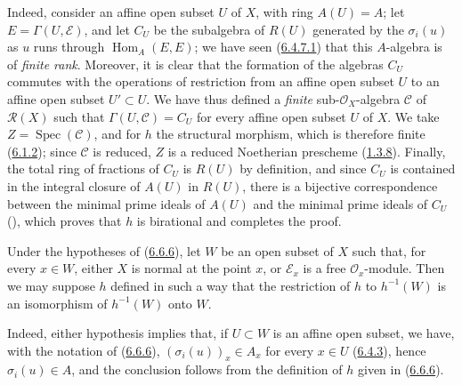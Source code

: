 Indeed, consider an affine open subset $U$ of $X$, with ring $A(U)=A$; let
$E=\Gamma(U,\mathcal{E})$, and let $C_U$ be the subalgebra of $R(U)$ generated
by the $\sigma_i(u)$ as $u$ runs through $\operatorname{Hom}_A(E,E)$; we
have seen (\hyperref[II.6.4.7.1]{6.4.7.1}) that this $A$-algebra is of
\emph{finite rank}. Moreover, it is clear that the formation of the algebras
$C_U$ commutes with the operations of restriction from an affine open subset
$U$ to an affine open subset $U'\subset U$. We have thus defined a
\emph{finite} sub-$\mathcal{O}_X$-algebra $\mathcal{C}$ of $\mathcal{R}(X)$
such that $\Gamma(U,\mathcal{C})=C_U$ for every affine open subset $U$ of
$X$. We
take $Z=\operatorname{Spec}(\mathcal{C})$, and for $h$ the structural
morphism, which is therefore finite (\hyperref[II.6.1.2]{6.1.2}); since
$\mathcal{C}$ is reduced, $Z$ is a reduced Noetherian prescheme
(\hyperref[II.1.3.8]{1.3.8}). Finally, the total ring of fractions of $C_U$
is $R(U)$ by definition, and since $C_U$ is contained in the integral
closure of $A(U)$ in $R(U)$, there is a bijective correspondence between the
minimal prime ideals of $A(U)$ and the minimal prime ideals of $C_U$
(\cite[vol.~I, p.~259]{I-13}), which proves that $h$ is birational and
completes the proof.

\begin{corollary}[6.6.7]
\label{II.6.6.7}
Under the hypotheses of \textup{(\hyperref[II.6.6.6]{6.6.6})}, let $W$ be an open
subset of $X$ such that, for every $x\in W$, either $X$ is normal at the
point $x$, or $\mathcal{E}_x$ is a free $\mathcal{O}_x$-module. Then we may
suppose $h$ defined in such a way that the restriction of $h$ to $h^{-1}(W)$
is an isomorphism of $h^{-1}(W)$ onto $W$.
\end{corollary}

Indeed, either hypothesis implies that, if $U\subset W$ is an affine open
subset, we have, with the notation of
(\hyperref[II.6.6.6]{6.6.6}), $(\sigma_i(u))_x\in A_x$ for every
$x\in U$ (\hyperref[II.6.4.3]{6.4.3}), hence $\sigma_i(u)\in A$, and the
conclusion follows from the definition of $h$ given in
(\hyperref[II.6.6.6]{6.6.6}).

